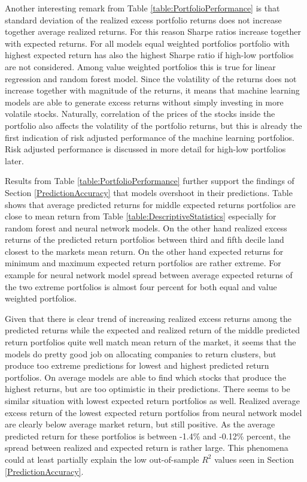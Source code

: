 \documentclass[12pt]{article}
\begin{document}
Another interesting remark from Table \ref{table:PortfolioPerformance} is that standard deviation of the realized excess portfolio returns does not increase together average realized returns. For this reason Sharpe ratios increase together with expected returns. For all models equal weighted portfolios portfolio with highest expected return has also the highest Sharpe ratio if high-low portfolios are not considered. Among value weighted portfolios this is true for linear regression and random forest model. Since the volatility of the returns does not increase together with magnitude of the returns, it means that machine learning models are able to generate excess returns without simply investing in more volatile stocks. Naturally, correlation of the prices of the stocks inside the portfolio also affects the volatility of the portfolio returns, but this is already the first indication of risk adjusted performance of the machine learning portfolios. Risk adjusted performance is discussed in more detail for high-low portfolios later. \par

Results from Table \ref{table:PortfolioPerformance} further support the findings of Section \ref{PredictionAccuracy} that models overshoot in their predictions. Table shows that average predicted returns for middle expected returns portfolios are close to mean return from Table \ref{table:DescriptiveStatistics} especially for random forest and neural network models. On the other hand realized excess returns of the predicted return portfolios between third and fifth decile land closest to the markets mean return. On the other hand expected returns for minimum and maximum expected return portfolios are rather extreme. For example for neural network model spread between average expected returns of the two extreme portfolios is almost four percent for both equal and value weighted portfolios. \par

Given that there is clear trend of increasing realized excess returns among the predicted returns while the expected and realized return of the middle predicted return portfolios quite well match mean return of the market, it seems that the models do pretty good job on allocating companies to return clusters, but produce too extreme predictions for lowest and highest predicted return portfolios. On average models are able to find which stocks that produce the highest returns, but are too optimistic in their predictions. There seems to be similar situation with lowest expected return portfolios as well. Realized average excess return of the lowest expected return portfolios from neural network model are clearly below average market return, but still positive. As the average predicted return for these portfolios is between -1.4\% and -0.12\% percent, the spread between realized and expected return is rather large. This phenomena could at least partially explain the low out-of-sample $R^2$ values seen in Section \ref{PredictionAccuracy}. \par  
\end{document}
